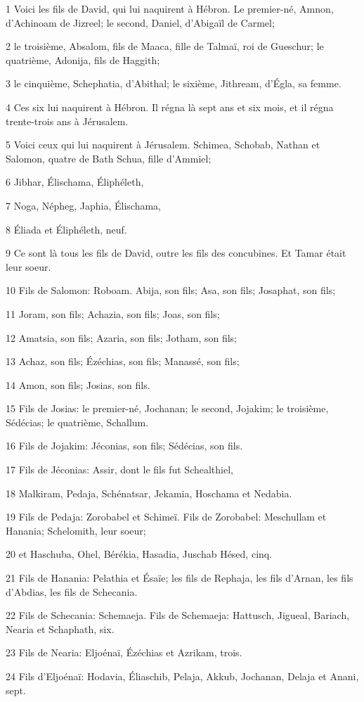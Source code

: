 \par 1 Voici les fils de David, qui lui naquirent à Hébron. Le premier-né, Amnon, d'Achinoam de Jizreel; le second, Daniel, d'Abigaïl de Carmel;
\par 2 le troisième, Absalom, fils de Maaca, fille de Talmaï, roi de Gueschur; le quatrième, Adonija, fils de Haggith;
\par 3 le cinquième, Schephatia, d'Abithal; le sixième, Jithream, d'Égla, sa femme.
\par 4 Ces six lui naquirent à Hébron. Il régna là sept ans et six mois, et il régna trente-trois ans à Jérusalem.
\par 5 Voici ceux qui lui naquirent à Jérusalem. Schimea, Schobab, Nathan et Salomon, quatre de Bath Schua, fille d'Ammiel;
\par 6 Jibhar, Élischama, Éliphéleth,
\par 7 Noga, Népheg, Japhia, Élischama,
\par 8 Éliada et Éliphéleth, neuf.
\par 9 Ce sont là tous les fils de David, outre les fils des concubines. Et Tamar était leur soeur.
\par 10 Fils de Salomon: Roboam. Abija, son fils; Asa, son fils; Josaphat, son fils;
\par 11 Joram, son fils; Achazia, son fils; Joas, son fils;
\par 12 Amatsia, son fils; Azaria, son fils; Jotham, son fils;
\par 13 Achaz, son fils; Ézéchias, son fils; Manassé, son fils;
\par 14 Amon, son fils; Josias, son fils.
\par 15 Fils de Josias: le premier-né, Jochanan; le second, Jojakim; le troisième, Sédécias; le quatrième, Schallum.
\par 16 Fils de Jojakim: Jéconias, son fils; Sédécias, son fils.
\par 17 Fils de Jéconias: Assir, dont le fils fut Schealthiel,
\par 18 Malkiram, Pedaja, Schénatsar, Jekamia, Hoschama et Nedabia.
\par 19 Fils de Pedaja: Zorobabel et Schimeï. Fils de Zorobabel: Meschullam et Hanania; Schelomith, leur soeur;
\par 20 et Haschuba, Ohel, Bérékia, Hasadia, Juschab Hésed, cinq.
\par 21 Fils de Hanania: Pelathia et Ésaïe; les fils de Rephaja, les fils d'Arnan, les fils d'Abdias, les fils de Schecania.
\par 22 Fils de Schecania: Schemaeja. Fils de Schemaeja: Hattusch, Jigueal, Bariach, Nearia et Schaphath, six.
\par 23 Fils de Nearia: Eljoénaï, Ézéchias et Azrikam, trois.
\par 24 Fils d'Eljoénaï: Hodavia, Éliaschib, Pelaja, Akkub, Jochanan, Delaja et Anani, sept.


